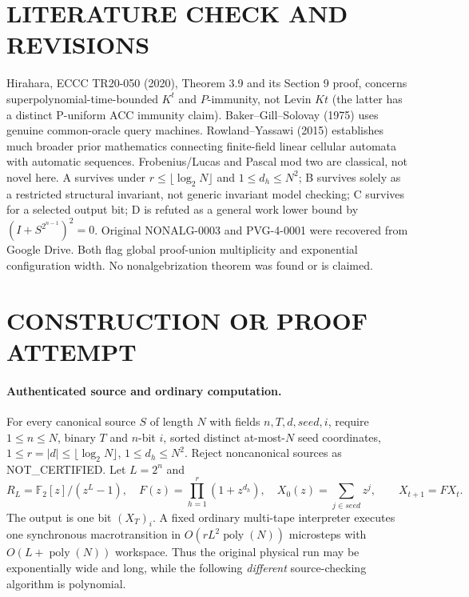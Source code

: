 \documentclass[10pt]{article}
\begin{document}
\section{LITERATURE CHECK AND REVISIONS}
Hirahara, ECCC TR20-050 (2020), Theorem 3.9 and its Section 9 proof,
concerns superpolynomial-time-bounded $K^t$ and $P$-immunity, not Levin $Kt$
(the latter has a distinct P-uniform ACC immunity claim).
Baker--Gill--Solovay (1975) uses genuine common-oracle query machines.
Rowland--Yassawi (2015) establishes much broader prior mathematics
connecting finite-field linear cellular automata with automatic sequences.
Frobenius/Lucas and Pascal mod two are classical, not novel here.
A survives under $r\le\lfloor\log_2 N\rfloor$ and $1\le d_h\le N^2$;
B survives solely as a restricted structural invariant, not generic
invariant model checking; C survives for a selected output bit;
D is refuted as a general work lower bound by
$(I+S^{2^{n-1}})^2=0$.
Original NONALG-0003 and PVG-4-0001 were recovered from Google Drive.
Both flag global proof-union multiplicity and exponential configuration width.
No nonalgebrization theorem was found or is claimed.

\section{CONSTRUCTION OR PROOF ATTEMPT}
\paragraph{Authenticated source and ordinary computation.}
For every canonical source $S$ of length $N$ with fields
$n,T,d,seed,i$, require $1\le n\le N$, binary $T$ and $n$-bit
$i$, sorted distinct at-most-$N$ seed coordinates,
$1\le r=|d|\le\lfloor\log_2 N\rfloor$,
$1\le d_h\le N^2$. Reject noncanonical sources as NOT\_CERTIFIED.
Let $L=2^n$ and
\[
R_L=\mathbb F_2[z]/(z^L-1),\quad
F(z)=\prod_{h=1}^r(1+z^{d_h}),\quad
X_0(z)=\sum_{j\in seed}z^j,\qquad X_{t+1}=FX_t.
\]
The output is one bit $(X_T)_i$. A fixed ordinary multi-tape
interpreter executes one synchronous macrotransition in
$O(rL^2\operatorname{poly}(N))$ microsteps with
$O(L+\operatorname{poly}(N))$ workspace. Thus the original physical
run may be exponentially wide and long, while the following
\emph{different} source-checking algorithm is polynomial.
\end{document}

